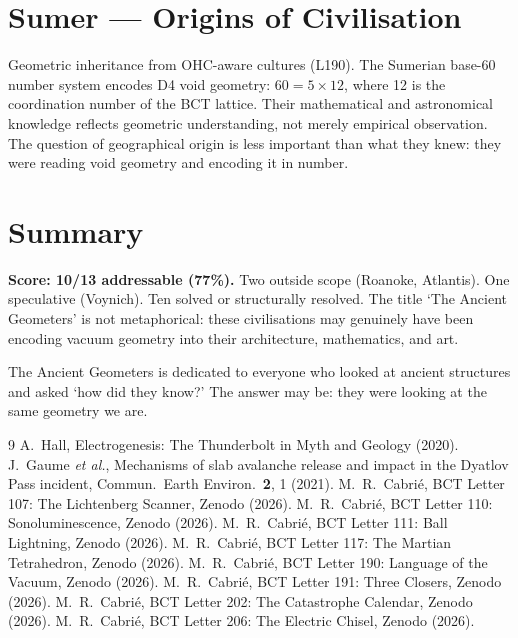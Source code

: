 \documentclass[aps,prl,twocolumn,superscriptaddress]{revtex4-2}
\begin{document}
\section{Sumer --- Origins of Civilisation}

Geometric inheritance from OHC-aware cultures (L190). The Sumerian base-60 number system encodes D4 void geometry: $60 = 5 \times 12$, where 12 is the coordination number of the BCT lattice. Their mathematical and astronomical knowledge reflects geometric understanding, not merely empirical observation. The question of geographical origin is less important than what they knew: they were reading void geometry and encoding it in number.

\section{Summary}

\textbf{Score: 10/13 addressable (77\%).} Two outside scope (Roanoke, Atlantis). One speculative (Voynich). Ten solved or structurally resolved. The title `The Ancient Geometers' is not metaphorical: these civilisations may genuinely have been encoding vacuum geometry into their architecture, mathematics, and art.

\begin{acknowledgments}
The Ancient Geometers is dedicated to everyone who looked at ancient structures and asked `how did they know?' The answer may be: they were looking at the same geometry we are.
\end{acknowledgments}

\begin{thebibliography}{9}
 A.~Hall, Electrogenesis: The Thunderbolt in Myth and Geology (2020).
 J.~Gaume \emph{et al.}, Mechanisms of slab avalanche release and impact in the Dyatlov Pass incident, Commun.\ Earth Environ.\ \textbf{2}, 1 (2021).
 M.~R.~Cabri\'e, BCT Letter 107: The Lichtenberg Scanner, Zenodo (2026).
 M.~R.~Cabri\'e, BCT Letter 110: Sonoluminescence, Zenodo (2026).
 M.~R.~Cabri\'e, BCT Letter 111: Ball Lightning, Zenodo (2026).
 M.~R.~Cabri\'e, BCT Letter 117: The Martian Tetrahedron, Zenodo (2026).
 M.~R.~Cabri\'e, BCT Letter 190: Language of the Vacuum, Zenodo (2026).
 M.~R.~Cabri\'e, BCT Letter 191: Three Closers, Zenodo (2026).
 M.~R.~Cabri\'e, BCT Letter 202: The Catastrophe Calendar, Zenodo (2026).
 M.~R.~Cabri\'e, BCT Letter 206: The Electric Chisel, Zenodo (2026).
\end{thebibliography}
\end{document}
